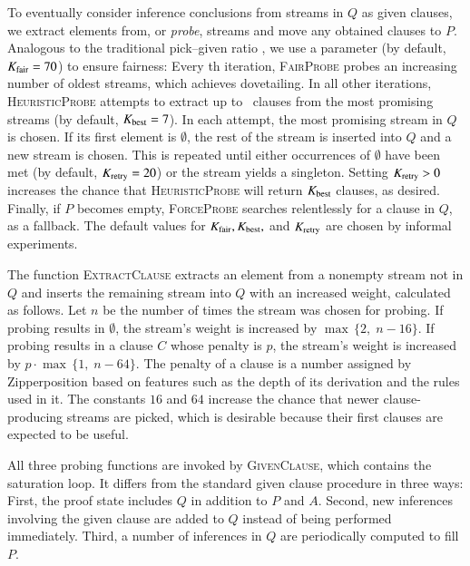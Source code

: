 To eventually consider inference conclusions from streams in $Q$ as given
clauses, we extract elements from, or \emph{probe}, streams and move any obtained
clauses to $P$. Analogous to the traditional pick--given ratio
\cite{ss-02-brainiac,mcw-1997-otter}, we use a parameter
\ParamMode{} (by default, $K_{\mathrm{fair}} = 70$) to ensure fairness: Every \ParamMode{}th iteration,
\textsc{FairProbe} probes an increasing number of oldest streams, which achieves
dovetailing. In all other iterations, \textsc{HeuristicProbe} attempts to
extract up to \ParamMaxStreams{}~clauses from the most promising streams (by default,
$K_{\mathrm{best}} = 7$).
In each attempt, the most promising stream in $Q$ is chosen. If its first
element is $\emptyset$, the rest of the stream is inserted into $Q$ and a new stream is
chosen. This is repeated until either \ParamRetry{} occurrences of $\emptyset$ have  been
met (by default, $K_{\mathrm{retry}} = 20$) or the stream yields a singleton. Setting $K_{\mathrm{retry}} > 0$ increases
the chance that \textsc{HeuristicProbe} will return $K_{\mathrm{best}}$ clauses, as desired. Finally, if $P$ becomes empty, \textsc{ForceProbe}
searches relentlessly for a clause in $Q$, as a fallback. The default values
for $K_{\mathrm{fair}}{}, K_{\mathrm{best}}{},$ and $K_{\mathrm{retry}}{}$ are chosen by informal
experiments.

The function \textsc{ExtractClause} extracts an element from a nonempty stream
not in $Q$ and inserts the remaining
stream into $Q$ with an increased weight, calculated as follows.
Let $n$ be the number of times the stream was chosen for
probing. If probing results in $\emptyset$, the stream's weight is increased by
$\max\,\{2{,}\; n-16\}$. If probing results in a clause $C$ whose penalty is
$p$, the stream's weight is increased by $p \cdot \max\,\{1{,}\; n-64\}$. The
penalty of a clause is a number assigned by Zipperposition based on
features such as the depth of its derivation and the rules used in it.
The constants $16$ and $64$ increase the chance that newer clause-producing streams are picked,
which is desirable because their first clauses are expected to be useful.

All three probing functions are invoked by
\textsc{GivenClause}, which contains the saturation loop. It differs
from the standard given clause procedure in three ways:
First, the proof state includes $Q$ in addition to $P$ and $A$. Second,
new inferences involving the given clause are added to $Q$ instead of being
performed immediately. Third, a number of inferences in $Q$ are periodically computed
to fill $P$.

